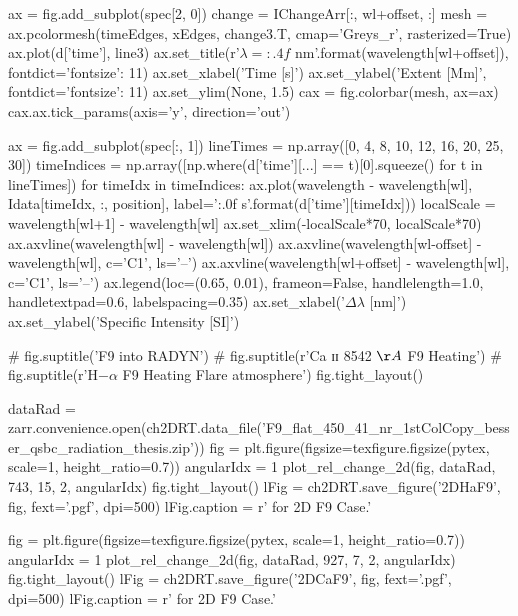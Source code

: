 \begin{pycode}[2DRT]
    ax = fig.add_subplot(spec[2, 0])
    change = IChangeArr[:, wl+offset, :]
    mesh = ax.pcolormesh(timeEdges, xEdges, change3.T, cmap='Greys_r', rasterized=True)
    ax.plot(d['time'], line3)
    ax.set_title(r'$\lambda={:.4f}$ nm'.format(wavelength[wl+offset]), fontdict={'fontsize': 11})
    ax.set_xlabel('Time [s]')
    ax.set_ylabel('Extent [Mm]', fontdict={'fontsize': 11})
    ax.set_ylim(None, 1.5)
    cax = fig.colorbar(mesh, ax=ax)
    cax.ax.tick_params(axis='y', direction='out')

    ax = fig.add_subplot(spec[:, 1])
    lineTimes = np.array([0, 4, 8, 10, 12, 16, 20, 25, 30])
    timeIndices = np.array([np.where(d['time'][...] == t)[0].squeeze() for t in lineTimes])
    for timeIdx in timeIndices:
        ax.plot(wavelength - wavelength[wl], Idata[timeIdx, :, position], label='{:.0f} s'.format(d['time'][timeIdx]))
    localScale = wavelength[wl+1] - wavelength[wl]
    ax.set_xlim(-localScale*70, localScale*70)
    ax.axvline(wavelength[wl] - wavelength[wl])
    ax.axvline(wavelength[wl-offset] - wavelength[wl], c='C1', ls='--')
    ax.axvline(wavelength[wl+offset] - wavelength[wl], c='C1', ls='--')
    ax.legend(loc=(0.65, 0.01), frameon=False, handlelength=1.0, handletextpad=0.6, labelspacing=0.35)
    ax.set_xlabel('$\Delta\lambda$ [nm]')
    ax.set_ylabel('Specific Intensity [SI]')

#         fig.suptitle('F9 into RADYN')
#         fig.suptitle(r'Ca ɪɪ 8542 $\AA$ F9 Heating')
    # fig.suptitle(r'H$-\alpha$ F9 Heating Flare atmosphere')
    fig.tight_layout()

dataRad = zarr.convenience.open(ch2DRT.data_file('F9_flat_450_41_nr_1stColCopy_besser_qsbc_radiation_thesis.zip'))
fig = plt.figure(figsize=texfigure.figsize(pytex, scale=1, height_ratio=0.7))
angularIdx = 1
plot_rel_change_2d(fig, dataRad, 743, 15, 2, angularIdx)
fig.tight_layout()
lFig = ch2DRT.save_figure('2DHaF9', fig, fext='.pgf', dpi=500)
lFig.caption = r'\Ha{} for 2D F9 Case.'

\end{pycode}


\begin{pycode}[2DRT]
fig = plt.figure(figsize=texfigure.figsize(pytex, scale=1, height_ratio=0.7))
angularIdx = 1
plot_rel_change_2d(fig, dataRad, 927, 7, 2, angularIdx)
fig.tight_layout()
lFig = ch2DRT.save_figure('2DCaF9', fig, fext='.pgf', dpi=500)
lFig.caption = r'\CaLine{} for 2D F9 Case.'
\end{pycode}

